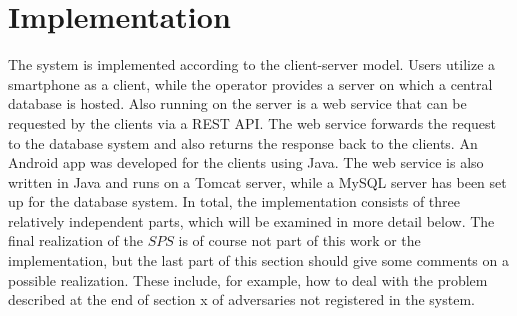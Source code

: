 \chapter{Implementation}
\label{ch:Implementation}
The system is implemented according to the client-server model. Users utilize a smartphone as a client, while the operator provides a server on which a central database is hosted. Also running on the server is a web service that can be requested by the clients via a REST API. The web service forwards the request to the database system and also returns the response back to the clients. An Android app was developed for the clients using Java. The web service is also written in Java and runs on a Tomcat server, while a MySQL server has been set up for the database system. In total, the implementation consists of three relatively independent parts, which will be examined in more detail below. The final realization of the $SPS$ is of course not part of this work or the implementation, but the last part of this section should give some comments on a possible realization. These include, for example, how to deal with the problem described at the end of section x of adversaries not registered in the system.

